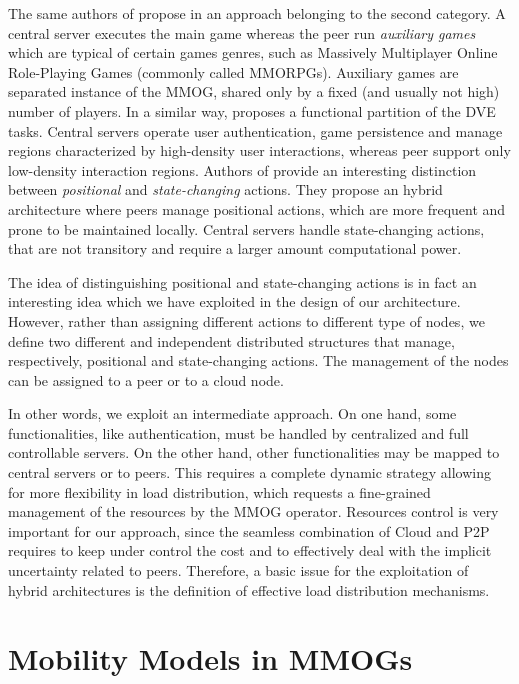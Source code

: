 \documentclass[final,10pt,a5paper]{phdimt}
\theoremstyle{definition}
\begin{document}
The same authors of \cite{Barri2010} propose in \cite{Barri2011} an approach belonging to the second category. A central server executes the main game whereas the peer run \textit{auxiliary games} which are typical of certain games genres, such as Massively Multiplayer Online Role-Playing Games (commonly called MMORPGs). Auxiliary games are separated instance of the MMOG, shared only by a fixed (and usually not high) number of players. 
In a similar way, \cite{Chen} proposes a functional partition of the DVE tasks. Central servers operate user authentication, game persistence and manage regions characterized by high-density user interactions, whereas peer support only low-density interaction regions. 
Authors of \cite{Jardine2008} provide an interesting distinction between \textit{positional} and \textit{state-changing} actions. They propose an hybrid architecture where peers manage positional actions, which are more frequent and prone to be maintained locally. Central servers handle state-changing actions, that are not transitory and require a larger amount computational power. 

The idea of distinguishing positional and state-changing actions is in fact an interesting idea which we have exploited 
in the design of our architecture.
However, rather than assigning different actions to different type of nodes, we define two different and independent distributed structures that manage, respectively, positional and state-changing actions.
The management of the nodes can be assigned  to a peer or to a cloud node.

In other words, we exploit an intermediate approach. On one hand, some functionalities, like authentication, must be handled by centralized and full controllable servers. On the other hand, other functionalities may be mapped
to central servers or to peers. This requires a complete dynamic strategy allowing for more flexibility in load distribution, which requests a fine-grained management of the resources by the MMOG operator. Resources control is very important for our approach, since the seamless combination of Cloud and P2P requires to keep under control the cost and to effectively deal with the implicit uncertainty related to peers. 
Therefore, a basic issue for the exploitation of hybrid architectures is the definition
of effective load distribution mechanisms. 


\section{Mobility Models in MMOGs}
\label{mobilitymodels}
\end{document}
